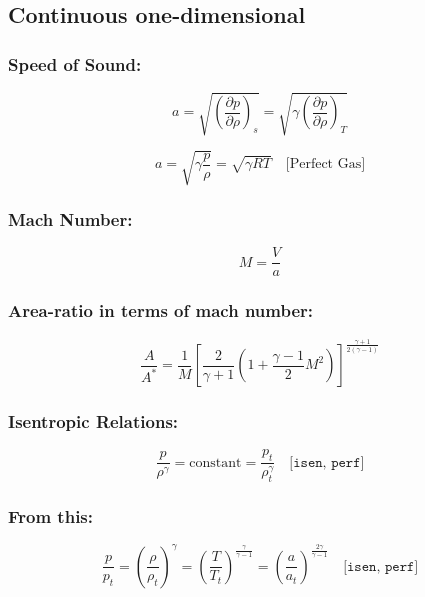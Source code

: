 \subsection*{Continuous one-dimensional}

\subsubsection*{Speed of Sound:}

\begin{equation}
	a = \sqrt{\left( \frac{\partial p}{\partial \rho} \right)_s} = \sqrt{\gamma \left( \frac{\partial p}{\partial \rho} \right)_T}
\end{equation}

\begin{equation}
	a = \sqrt{\gamma \frac{p}{\rho}} = \sqrt{\gamma RT} \quad \text{[Perfect Gas]}
\end{equation}

\subsubsection*{Mach Number:}

\begin{equation}
	M = \frac{V}{a}
\end{equation}

\subsubsection*{Area-ratio in terms of mach number:}
\begin{equation}
	\frac{A}{A^*} = \frac{1}{M} \left[ \frac{2}{\gamma + 1} \left( 1 + \frac{\gamma - 1}{2} M^2 \right) \right]^{\frac{\gamma + 1}{2(\gamma - 1)}}
	\label{}
\end{equation}
\subsubsection*{Isentropic Relations:}

\begin{equation}
	\frac{p}{\rho^\gamma} = \text{constant} = \frac{p_t}{\rho_t^\gamma} \quad \texttt{[isen, perf]}
\end{equation}

\subsubsection*{From this:}

\begin{equation}
	\frac{p}{p_t} = \left( \frac{\rho}{\rho_t} \right)^\gamma = \left( \frac{T}{T_t} \right)^{\frac{\gamma}{\gamma - 1}} = \left( \frac{a}{a_t} \right)^{\frac{2\gamma}{\gamma - 1}} \quad \texttt{[isen, perf]}
\end{equation}

